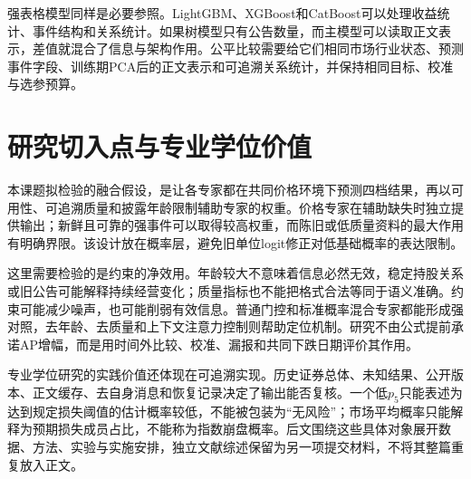 
强表格模型同样是必要参照。LightGBM、XGBoost和CatBoost可以处理收益统计、事件结构和关系统计\cite{r25,r26,r27}。如果树模型只有公告数量，而主模型可以读取正文表示，差值就混合了信息与架构作用。公平比较需要给它们相同市场行业状态、预测事件字段、训练期PCA后的正文表示和可追溯关系统计，并保持相同目标、校准与选参预算。

\section{研究切入点与专业学位价值}
本课题拟检验的融合假设，是让各专家都在共同价格环境下预测四档结果，再以可用性、可追溯质量和披露年龄限制辅助专家的权重。价格专家在辅助缺失时独立提供输出；新鲜且可靠的强事件可以取得较高权重，而陈旧或低质量资料的最大作用有明确界限。该设计放在概率层，避免旧单位logit修正对低基础概率的表达限制。

这里需要检验的是约束的净效用。年龄较大不意味着信息必然无效，稳定持股关系或旧公告可能解释持续经营变化；质量指标也不能把格式合法等同于语义准确。约束可能减少噪声，也可能削弱有效信息。普通门控和标准概率混合专家都能形成强对照，去年龄、去质量和上下文注意力控制则帮助定位机制。研究不由公式提前承诺AP增幅，而是用时间外比较、校准、漏报和共同下跌日期评价其作用。

专业学位研究的实践价值还体现在可追溯实现。历史证券总体、未知结果、公开版本、正文缓存、去自身消息和恢复记录决定了输出能否复核。一个低$p_5$只能表述为达到规定损失阈值的估计概率较低，不能被包装为“无风险”；市场平均概率只能解释为预期损失成员占比，不能称为指数崩盘概率。后文围绕这些具体对象展开数据、方法、实验与实施安排，独立文献综述保留为另一项提交材料，不将其整篇重复放入正文。
